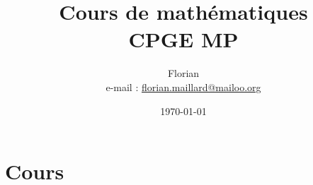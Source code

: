 \documentclass[10pt, a4paper, oneside]{book}
\title{\textbf{\Huge Cours de mathématiques \\ CPGE MP}}
\author{Florian \bsc{Maillard}\\ e-mail : \href{mailto:florian.maillard@mailoo.org}{florian.maillard@mailoo.org}}
\date{\today}
\begin{document}
\frontmatter
\maketitle
%
\mainmatter

\part{Cours}







































%
%
\backmatter
\dominitoc
\dominilof
\dominilot
\tableofcontents
\listoffigures
\listoftables
\end{document}
